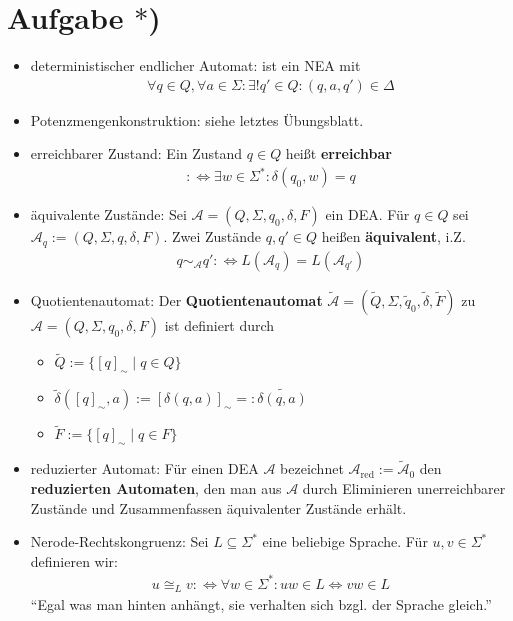 \documentclass[12pt,a4paper]{article}
\author{Willi Sontopski}
\newcommand{\A}{\mathcal{A}}
\begin{document}

\section*{Aufgabe $\ast$)}
\begin{itemize}
\item deterministischer endlicher Automat: ist ein NEA mit
\begin{align*}
	\forall q\in Q,\forall a\in\Sigma:\exists! q'\in Q:(q,a,q')\in\Delta
\end{align*}
\item Potenzmengenkonstruktion: siehe letztes Übungsblatt.
\item erreichbarer Zustand: Ein Zustand $q\in Q$ heißt \textbf{erreichbar}
\begin{align*}
	:\Longleftrightarrow\exists w\in\Sigma^\ast:\delta(q_0,w)=q
\end{align*}
\item äquivalente Zustände: Sei $\A=(Q,\Sigma,q_0,\delta,F)$ ein DEA. Für $q\in Q$ sei $\A_q:=(Q,\Sigma,q,\delta,F)$. Zwei Zustände $q,q'\in Q$ heißen \textbf{äquivalent}, i.Z. 
\begin{align*}
	q\sim_\A q':\Longleftrightarrow L(\A_q)=L(\A_{q'})
\end{align*}
\item Quotientenautomat: Der \textbf{Quotientenautomat} $\tilde{\A}=(\tilde{Q},\Sigma,\tilde{q}_0,\tilde{\delta},\tilde{F})$ zu $\A=(Q,\Sigma,q_0,\delta,F)$ ist definiert durch
\begin{itemize}
\item $\tilde{Q}:=\lbrace[q]_\sim\mid q\in Q\rbrace$
\item $\tilde{\delta}([q]_\sim,a):=[\delta(q,a)]_\sim=:\widetilde{\delta(q,a)}$
\item $\tilde{F}:=\lbrace[q]_\sim\mid q\in F\rbrace$
\end{itemize}
\item reduzierter Automat: Für einen DEA $\A$ bezeichnet $\A_{\text{red}}:=\tilde{\A}_0$ den \textbf{reduzierten Automaten}, den man aus $\A$ durch Eliminieren unerreichbarer Zustände und Zusammenfassen äquivalenter Zustände erhält.
\item Nerode-Rechtskongruenz: Sei $L\subseteq\Sigma^\ast$ eine beliebige Sprache. Für $u,v\in\Sigma^\ast$ definieren wir:
\begin{align*}
	u\cong_L v:\Longleftrightarrow\forall w\in\Sigma^\ast:uw\in L\Leftrightarrow vw\in L
\end{align*}
``Egal was man hinten anhängt, sie verhalten sich bzgl. der Sprache gleich.''
\end{itemize}
\end{document}
